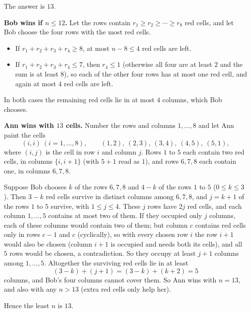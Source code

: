 The answer is $\boxed{13}$.

\textbf{Bob wins if $n\le12$.} Let the rows contain $r_1\ge r_2\ge\cdots\ge r_8$ red cells, and let Bob choose the four rows with the most red cells.
\begin{itemize}
\item If $r_1+r_2+r_3+r_4\ge8$, at most $n-8\le4$ red cells are left.
\item If $r_1+r_2+r_3+r_4\le7$, then $r_4\le1$ (otherwise all four are at least $2$ and the sum is at least $8$), so each of the other four rows has at most one red cell, and again at most $4$ red cells are left.
\end{itemize}
In both cases the remaining red cells lie in at most $4$ columns, which Bob chooses.

\textbf{Ann wins with $13$ cells.} Number the rows and columns $1,\dots,8$ and let Ann paint the cells
\[
(i,i)\ (i=1,\dots,8),\qquad(1,2),\ (2,3),\ (3,4),\ (4,5),\ (5,1),
\]
where $(i,j)$ is the cell in row $i$ and column $j$. Rows $1$ to $5$ each contain two red cells, in columns $\{i,i+1\}$ (with $5+1$ read as $1$), and rows $6,7,8$ each contain one, in columns $6,7,8$.

Suppose Bob chooses $k$ of the rows $6,7,8$ and $4-k$ of the rows $1$ to $5$ ($0\le k\le3$). Then $3-k$ red cells survive in distinct columns among $6,7,8$, and $j=k+1$ of the rows $1$ to $5$ survive, with $1\le j\le4$. These $j$ rows have $2j$ red cells, and each column $1,\dots,5$ contains at most two of them. If they occupied only $j$ columns, each of these columns would contain two of them; but column $c$ contains red cells only in rows $c-1$ and $c$ (cyclically), so with every chosen row $i$ the row $i+1$ would also be chosen (column $i+1$ is occupied and needs both its cells), and all $5$ rows would be chosen, a contradiction. So they occupy at least $j+1$ columns among $1,\dots,5$. Altogether the surviving red cells lie in at least
\[
(3-k)+(j+1)=(3-k)+(k+2)=5
\]
columns, and Bob's four columns cannot cover them. So Ann wins with $n=13$, and also with any $n>13$ (extra red cells only help her).

Hence the least $n$ is $13$.
